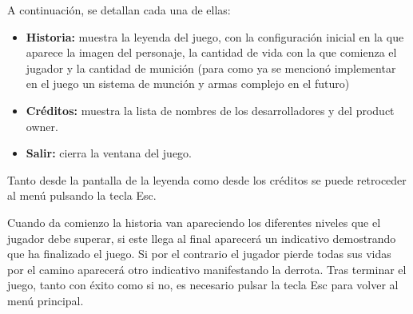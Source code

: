 A continuación, se detallan cada una de ellas: 
\begin{itemize}
	\item \textbf{Historia:} muestra la leyenda del juego, con la configuración inicial en la que aparece la imagen del personaje, la cantidad de vida con la que comienza el jugador y la cantidad de munición (para como ya se mencionó implementar en el juego un sistema de munción y armas complejo en el futuro) 
	\item \textbf{Créditos:} muestra la lista de nombres de los desarrolladores y del product owner.  
	\item \textbf{Salir:} cierra la ventana del juego. 
\end{itemize}



Tanto desde la pantalla de la leyenda como desde los créditos se puede retroceder al menú pulsando la tecla Esc. 


Cuando da comienzo la historia van apareciendo los diferentes niveles que el jugador debe superar, si este llega al final aparecerá un indicativo demostrando que ha finalizado el juego. Si por el contrario el jugador pierde todas sus vidas por el camino aparecerá otro indicativo manifestando la derrota. Tras terminar el juego, tanto con éxito como si no, es necesario pulsar la tecla Esc para volver al menú principal.    